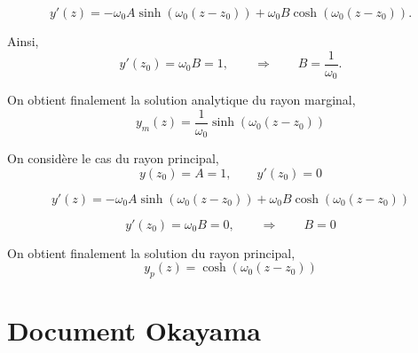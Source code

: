 \documentclass{article}
\begin{document}
\[
y'(z) =
- \omega_0 A \sinh\!\left(\omega_0 (z - z_0)\right)
+ \omega_0 B \cosh\!\left(\omega_0 (z - z_0)\right).
\]

Ainsi,
\[
y'(z_0) = \omega_0 B = 1 ,
\qquad \Rightarrow \qquad
B = \frac{1}{\omega_0}.
\]

On obtient finalement la solution analytique du rayon marginal,
\[
\boxed{
y_m(z) = \frac{1}{\omega_0}
\sinh\!\left(\omega_0 (z - z_0)\right)
}
\]

On considère  le cas du rayon principal,
\[
y(z_0) = A = 1, \qquad y'(z_0) = 0 
\]

\[
y'(z) =
- \omega_0 A \sinh\!\left(\omega_0 (z - z_0)\right)
+ \omega_0 B \cosh\!\left(\omega_0 (z - z_0)\right)
\]

\[
y'(z_0) = \omega_0 B = 0 , \qquad \Rightarrow \qquad B = 0 
\]

On obtient finalement la solution du rayon principal,
\[
\boxed{
y_p(z) = \cosh\!\left(\omega_0 (z - z_0)\right)
}
\]

\section{Document Okayama}
\end{document}
